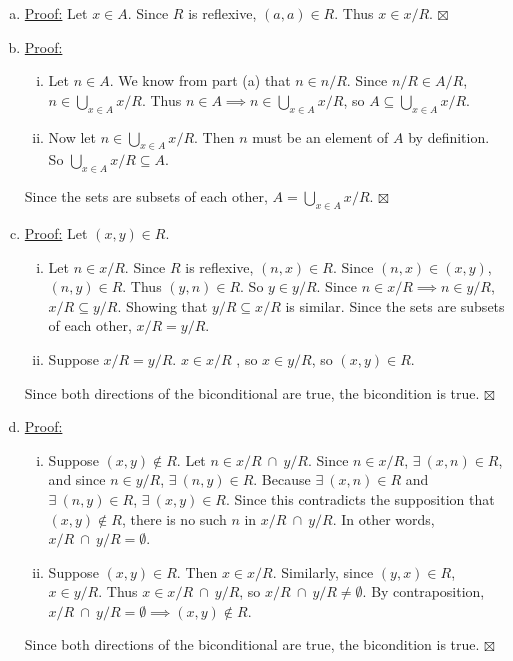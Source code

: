 \documentclass[a4paper,12pt]{article}
\newcommand{\biguni}[1]
{
\displaystyle\bigcup_{#1}
}
\newcommand{\sig}{$\boxtimes$}
\begin{document}
{
\begin{enumerate}[(a)]
\item
\underline{Proof:} Let $x \in A$. Since $R$ is reflexive, $(a, a) \in R$. Thus $x \in x/R$. \sig
\item
\underline{Proof:}
   \begin{enumerate}[(i)]
   \item
   Let $n \in A$. We know from part (a) that $n \in n/R$. Since $n/R \in A/R$, $n \in \biguni{x \in A} x/R$. Thus $n \in A \implies n \in \biguni{x \in A} x/R$, so $A \subseteq \biguni{x \in A} x/R$.
   \item
   Now let $n \in \biguni{x \in A} x/R$. Then $n$ must be an element of $A$ by definition. So $\biguni{x \in A} x/R \subseteq A$.
   \end{enumerate}
Since the sets are subsets of each other, $A = \biguni{x \in A} x/R$. \sig
\item
\underline{Proof:} Let $(x, y) \in R$.
   \begin{enumerate}[(i)]
   \item
   Let $n \in x/R$. Since $R$ is reflexive, $(n, x) \in R$. Since $(n, x) \in (x, y)$, $(n, y) \in R$. Thus $(y, n) \in R$. So $y \in y/R$. Since $n \in x/R \implies n \in y/R$, $x/R \subseteq y/R$. Showing that $y/R \subseteq x/R$ is similar. Since the sets are subsets of each other, $x/R = y/R$.
   \item
   Suppose $x/R = y/R$. $x \in x/R$ , so $x \in y/R$, so $(x, y) \in R$.
   \end{enumerate}
Since both directions of the biconditional are true, the bicondition is true. \sig
\item
\underline{Proof:} 
   \begin{enumerate}[(i)]
   \item
   Suppose $(x, y) \not\in R$. Let $n \in x/R~\cap~y/R$. Since $n \in x/R$, $\exists~(x, n) \in R$, and since $n \in y/R$, $\exists~(n, y) \in R$. Because $\exists~(x, n) \in R$ and $\exists~(n, y) \in R$, $\exists~(x, y) \in R$. Since this contradicts the supposition that $(x, y) \not\in R$, there is no such $n$ in $x/R~\cap~y/R$. In other words, $x/R~\cap~y/R = \emptyset$.
   \item
   Suppose $(x, y) \in R$. Then $x \in x/R$. Similarly, since $(y, x) \in R$, $x \in y/R$. Thus $x \in x/R~\cap~y/R$, so $x/R~\cap~y/R \neq \emptyset$. By contraposition, $x/R~\cap~y/R = \emptyset \implies (x, y) \not\in R$.
   \end{enumerate}
Since both directions of the biconditional are true, the bicondition is true. \sig
\end{enumerate}
}
\end{document}
